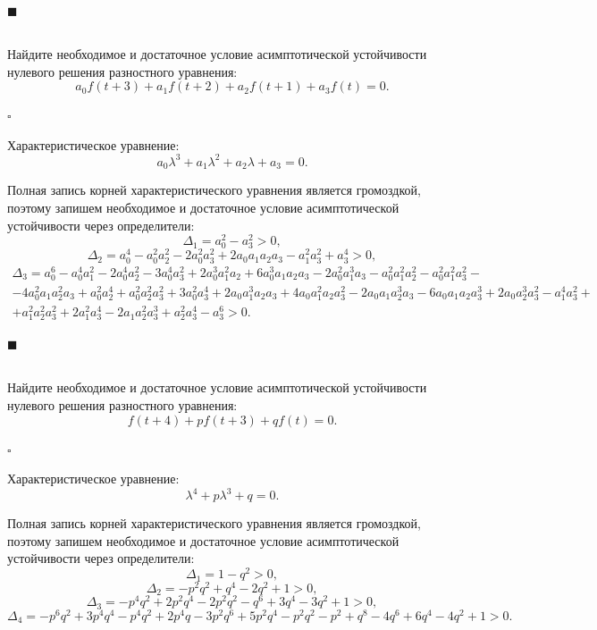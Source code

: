 \documentclass[a4paper]{article}
\newcommand{\solutionstart}{{\noindent $\square$ \\}}
\newcommand{\solutionend}{{\noindent $\blacksquare$ \\}}
\begin{document}
\solutionend


\subsection{}
Найдите необходимое и достаточное условие асимптотической устойчивости нулевого решения разностного уравнения:
\[
	a_0 f (t + 3) + a_1 f(t + 2) + a_2 f(t + 1) + a_3 f(t) = 0.
\]

\solutionstart

Характеристическое уравнение:
\[
	a_0 \lambda^3 + a_1 \lambda^2 + a_2 \lambda + a_3 = 0.
\]

Полная запись корней характеристического уравнения является громоздкой, поэтому запишем необходимое и достаточное условие асимптотической устойчивости через определители:
\[
\Delta_1 = a_0^2 - a_3^2 > 0,
\]
\[
\Delta_2 = a_0^4 - a_0^2 a_2^2 - 2 a_0^2 a_3^2 + 2 a_0 a_1 a_2 a_3 - a_1^2 a_3^2 + a_3^4 > 0,
\]
\begin{gather*}
\Delta_3 = a_0^6 - a_0^4 a_1^2 - 2 a_0^4 a_2^2 - 3 a_0^4 a_3^2 + 2 a_0^3 a_1^2 a_2 + 6 a_0^3 a_1 a_2 a_3 - 2 a_0^2 a_1^3 a_3 - a_0^2 a_1^2 a_2^2 - a_0^2 a_1^2 a_3^2 -\\- 4 a_0^2 a_1 a_2^2 a_3 + a_0^2 a_2^4 + a_0^2 a_2^2 a_3^2 + 3 a_0^2 a_3^4 + 2 a_0 a_1^3 a_2 a_3 + 4 a_0 a_1^2 a_2 a_3^2 - 2 a_0 a_1 a_2^3 a_3 - 6 a_0 a_1 a_2 a_3^3 + 2 a_0 a_2^3 a_3^2 - a_1^4 a_3^2 +\\+ a_1^2 a_2^2 a_3^2 + 2 a_1^2 a_3^4 - 2 a_1 a_2^2 a_3^3 + a_2^2 a_3^4 - a_3^6 > 0.
\end{gather*}

\solutionend


\subsection{}
Найдите необходимое и достаточное условие асимптотической устойчивости нулевого решения разностного уравнения:
\[
	f (t + 4) + p f(t + 3) + q f(t) = 0.
\]

\solutionstart

Характеристическое уравнение:
\[
	\lambda^4 + p \lambda^3 + q = 0.
\]

Полная запись корней характеристического уравнения является громоздкой, поэтому запишем необходимое и достаточное условие асимптотической устойчивости через определители:
\[
\Delta_1 = 1 - q^2 > 0,
\]
\[
\Delta_2 = -p^2 q^2 + q^4 - 2 q^2 + 1 > 0,
\]
\[
\Delta_3 = -p^4 q^2 + 2 p^2 q^4 - 2 p^2 q^2 - q^6 + 3 q^4 - 3 q^2 + 1 > 0,
\]
\[
\Delta_4 = -p^6 q^2 + 3 p^4 q^4 - p^4 q^2 + 2 p^4 q - 3 p^2 q^6 + 5 p^2 q^4 - p^2 q^2 - p^2 + q^8 - 4 q^6 + 6 q^4 - 4 q^2 + 1 > 0.
\]
\end{document}
